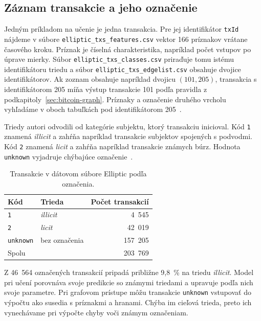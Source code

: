 \subsection{Záznam transakcie a jeho označenie}

Jedným príkladom na učenie je jedna transakcia. Pre jej identifikátor
\texttt{txId} nájdeme v súbore
\nolinkurl{elliptic_txs_features.csv} vektor 166 príznakov vrátane
časového kroku. Príznak je číselná charakteristika, napríklad
počet vstupov po úprave mierky. Súbor
\nolinkurl{elliptic_txs_classes.csv} priraďuje tomu istému
identifikátoru triedu a súbor \nolinkurl{elliptic_txs_edgelist.csv}
obsahuje dvojice identifikátorov. Ak zoznam obsahuje napríklad
dvojicu $(101,205)$, transakcia s identifikátorom 205 míňa výstup
transakcie 101 podľa pravidla z podkapitoly~\ref{sec:bitcoin-graph}.
Príznaky a označenie druhého vrcholu vyhľadáme v oboch tabuľkách
pod identifikátorom 205~\cite{weber2019elliptic,ellipticDataset}.

Triedy autori odvodili od kategórie subjektu, ktorý transakciu
inicioval. Kód \texttt{1} znamená \emph{illicit} a zahŕňa
napríklad transakcie subjektov spojených s podvodmi. Kód
\texttt{2} znamená \emph{licit} a zahŕňa napríklad transakcie
známych búrz. Hodnota \texttt{unknown} vyjadruje chýbajúce
označenie~\cite{weber2019elliptic}.

\begin{table}[htbp]
  \centering
  \caption{Transakcie v dátovom súbore Elliptic podľa označenia.}
  \label{tab:elliptic-overview}
  \begin{tabular}{llr}
    \toprule
    Kód & Trieda & Počet transakcií \\
    \midrule
    \texttt{1} & \emph{illicit} & 4~545 \\
    \texttt{2} & \emph{licit} & 42~019 \\
    \texttt{unknown} & bez označenia & 157~205 \\
    \midrule
    \multicolumn{2}{l}{Spolu} & 203~769 \\
    \bottomrule
  \end{tabular}
\end{table}

Z 46~564 označených transakcií pripadá približne 9,8~\% na triedu
\emph{illicit}. Model pri učení porovnáva svoje predikcie so známymi
triedami a upravuje podľa nich svoje parametre. Pri grafovom prístupe
môžu transakcie \texttt{unknown} vstupovať do výpočtu ako susedia
s príznakmi a hranami. Chýba im cieľová trieda, preto ich
vynechávame pri výpočte chyby voči známym označeniam.

